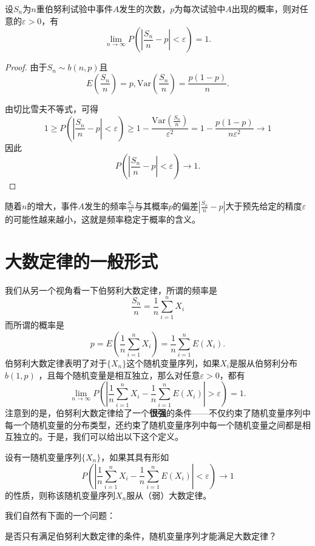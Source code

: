 \begin{theorem}[伯努利大数定律]
设$S_{n}$为$n$重伯努利试验中事件$A$发生的次数，$p$为每次试验中$A$出现的概率，则对任意的$\varepsilon>0$，有$$\lim_{n \to \infty} P\left( \left |  \frac{S_{n}}{n}-p  \right | < \varepsilon  \right)=1.$$
\end{theorem}
\begin{proof}
由于$S_{n}\sim b(n,p)$且$$E(\frac{S_{n}}{n})=p,\text{Var}(\frac{S_{n}}{n})=\frac{p(1-p)}{n}.$$

由切比雪夫不等式，可得
$$1\ge  P \left( \left |  \frac{S_{n}}{n}-p  \right | < \varepsilon \right )\ge 1-\frac{\text{Var}(\frac{S_{n}}{n})}{\varepsilon ^{2}}=1-\frac{p(1-p)}{n\varepsilon ^{2}} \rightarrow 1 $$
因此$$P\left( \left |  \frac{S_{n}}{n}-p  \right | < \varepsilon  \right)\rightarrow 1.$$
\end{proof}
\begin{remark}
随着$n$的增大，事件$A$发生的频率$\frac{S_{n}}{n}$与其概率$p$的偏差$\left | \frac{S_{n}}{n}-p \right |$大于预先给定的精度$\varepsilon$的可能性越来越小，这就是频率稳定于概率的含义。
\end{remark}


\section{大数定律的一般形式}
我们从另一个视角看一下伯努利大数定律，所谓的频率是
$$
\frac{S_n}{n} = \frac{1}{n} \sum_{i=1}^n X_i
$$
而所谓的概率是
$$
p = E\left( \frac{1}{n} \sum_{i=1}^n X_i\right) =\frac{1}{n} \sum_{i=1}^n E(X_i).
$$
伯努利大数定律表明了对于$\{X_n\}$这个随机变量序列，如果$X_i$是服从伯努利分布$b(1,p)$ ，且每个随机变量是相互独立，那么对任意$\varepsilon>0$，都有
$$
\lim_{n\rightarrow \infty} P\left( \left|   \frac{1}{n} \sum_{i=1}^n X_i - \frac{1}{n} \sum_{i=1}^n E(X_i)\right| >\varepsilon \right) =1.
$$
注意到的是，伯努利大数定律给了一个\textbf{很强}的条件——不仅约束了随机变量序列中每一个随机变量的分布类型，还约束了随机变量序列中每一个随机变量之间都是相互独立的。于是，我们可以给出以下这个定义。

\begin{definition}[弱大数定律]
设有一随机变量序列$\{X_{n}\}$，如果其具有形如
$$P\left( \left |  \frac{1}{n}\sum_{i=1}^{n}X_{i}-\frac{1}{n}\sum_{i=1}^{n}E(X_{i})   \right | < \varepsilon  \right)\rightarrow 1$$
的性质，则称该随机变量序列${X_{n}}$服从（弱）大数定律。
\end{definition}

我们自然有下面的一个问题：
\begin{problem}
是否只有满足伯努利大数定律的条件，随机变量序列才能满足大数定律？
\end{problem}


